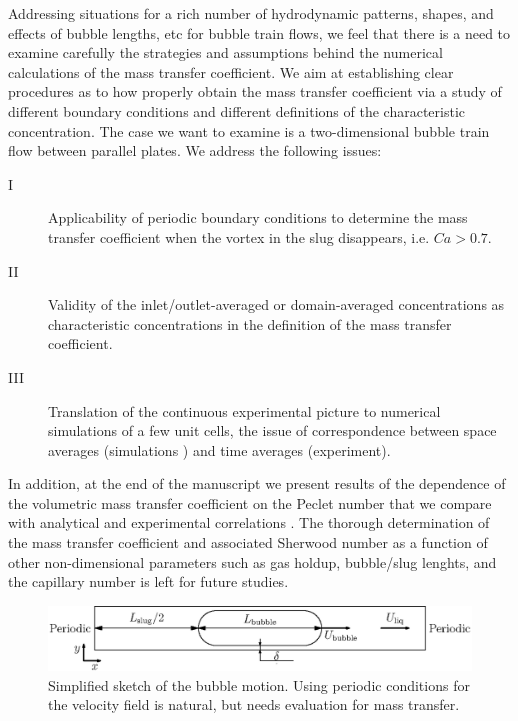 \documentclass{article}
\begin{document}
Addressing situations for a rich number of hydrodynamic patterns, shapes, and
effects of bubble lengths, etc for bubble train flows, we feel that there is a need to examine 
carefully the strategies and assumptions behind the numerical calculations
of the mass transfer coefficient. We aim at establishing clear
procedures as to how properly obtain the mass transfer coefficient via a study
of different boundary conditions and different definitions of the characteristic concentration.
The case we want to examine is a two-dimensional bubble train flow between parallel plates.
We address the following issues:
 \begin{description}
 \item[I] Applicability of periodic boundary
conditions to determine the mass transfer coefficient when the vortex in the slug
disappears, i.e. $Ca>0.7$.
 \item[II] Validity of the inlet/outlet-averaged or domain-averaged concentrations as
characteristic concentrations in the definition of the mass transfer
coefficient.
 \item[III] Translation of the continuous experimental picture to
numerical simulations of a few unit cells, the issue of correspondence
between space averages (simulations \cite{vanbaten-circular}) and time averages (experiment).
\end{description}
In addition, at the end of the manuscript we present results of the dependence of the volumetric
mass transfer coefficient on the Peclet number that we compare with analytical \cite{irandoust} and experimental correlations
\cite{yue-mass}.  The thorough determination of the mass transfer coefficient and associated Sherwood number as a
function of other non-dimensional parameters such as gas holdup, bubble/slug
lenghts, and the capillary number is left for future studies.
\begin{figure}[htb!]
\includegraphics[width=\textwidth]{Figures/benchmark_hydro.eps}
\caption{Simplified sketch of the bubble motion. Using periodic
conditions for the velocity field is natural, but needs evaluation for mass
transfer.
\label{fig:benchmark:hydro}}
\end{figure}
\end{document}
